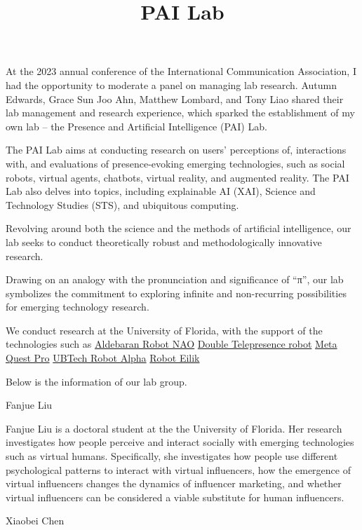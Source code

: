 \documentclass[]{article}
\title{PAI Lab}
\author{}
\date{\vspace{-2.5em}}
\begin{document}
\maketitle

At the 2023 annual conference of the International Communication
Association, I had the opportunity to moderate a panel on managing lab
research. Autumn Edwards, Grace Sun Joo Ahn, Matthew Lombard, and Tony
Liao shared their lab management and research experience, which sparked
the establishment of my own lab -- the Presence and Artificial
Intelligence (PAI) Lab.

The PAI Lab aims at conducting research on users' perceptions of,
interactions with, and evaluations of presence-evoking emerging
technologies, such as social robots, virtual agents, chatbots, virtual
reality, and augmented reality. The PAI Lab also delves into topics,
including explainable AI (XAI), Science and Technology Studies (STS),
and ubiquitous computing.

Revolving around both the science and the methods of artificial
intelligence, our lab seeks to conduct theoretically robust and
methodologically innovative research.

Drawing on an analogy with the pronunciation and significance of ``π'',
our lab symbolizes the commitment to exploring infinite and
non-recurring possibilities for emerging technology research.

We conduct research at the University of Florida, with the support of
the technologies such as
\href{https://www.aldebaran.com/en/nao}{Aldebaran Robot NAO}
\href{https://www.doublerobotics.com/}{Double Telepresence robot}
\href{https://www.meta.com/quest/quest-pro/}{Meta Quest Pro}
\href{https://www.youtube.com/watch?v=7Brb9k1zIso\&t=10s}{UBTech Robot
Alpha} \href{https://energizelab.com/}{Robot Eilik}

Below is the information of our lab group.

Fanjue Liu

Fanjue Liu is a doctoral student at the the University of Florida. Her
research investigates how people perceive and interact socially with
emerging technologies such as virtual humans. Specifically, she
investigates how people use different psychological patterns to interact
with virtual influencers, how the emergence of virtual influencers
changes the dynamics of influencer marketing, and whether virtual
influencers can be considered a viable substitute for human influencers.

Xiaobei Chen
\end{document}
